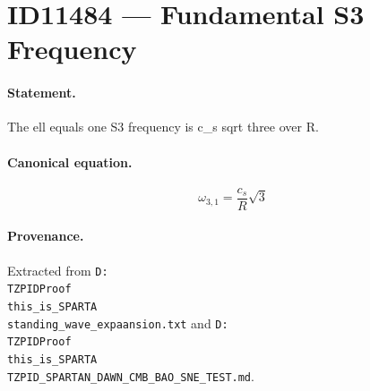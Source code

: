 \section*{ID11484 --- Fundamental S3 Frequency}

\paragraph{Statement.}
The ell equals one S3 frequency is c_s sqrt three over R.

\paragraph{Canonical equation.}
\[
\omega_{3,1}=\frac{c_s}{R}\sqrt3
\]

\paragraph{Provenance.}
Extracted from \texttt{D:\\TZPIDProof\\this\_is\_SPARTA\\standing\_wave\_expaansion.txt} and \texttt{D:\\TZPIDProof\\this\_is\_SPARTA\\TZPID\_SPARTAN\_DAWN\_CMB\_BAO\_SNE\_TEST.md}.
